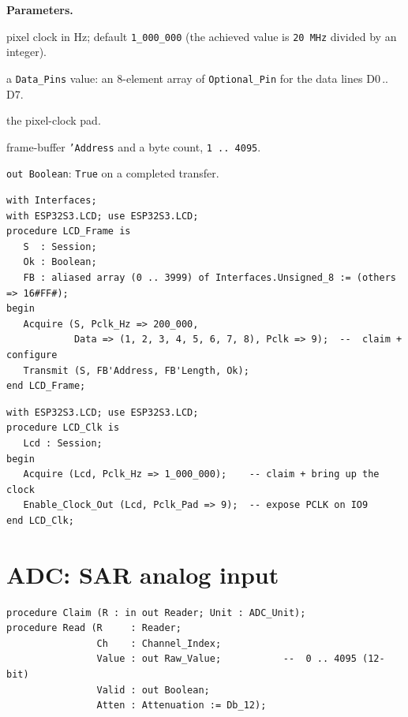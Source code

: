 \textbf{Parameters.}
\begin{description}[style=nextline]
\item[\texttt{Pclk\_Hz}] pixel clock in Hz; default \texttt{1\_000\_000} (the
  achieved value is \texttt{20\,MHz} divided by an integer).
\item[\texttt{Data}] a \texttt{Data\_Pins} value: an 8-element array of
  \texttt{Optional\_Pin} for the data lines D0\,..\,D7.
\item[\texttt{Pclk} / \texttt{Pclk\_Pad}] the pixel-clock pad.
\item[\texttt{Tx}, \texttt{Length}] frame-buffer \texttt{'Address} and a byte
  count, \texttt{1\,..\,4095}.
\item[\texttt{Ok}] \texttt{out Boolean}: \texttt{True} on a completed transfer.
\end{description}

\begin{lstlisting}
with Interfaces;
with ESP32S3.LCD; use ESP32S3.LCD;
procedure LCD_Frame is
   S  : Session;
   Ok : Boolean;
   FB : aliased array (0 .. 3999) of Interfaces.Unsigned_8 := (others => 16#FF#);
begin
   Acquire (S, Pclk_Hz => 200_000,
            Data => (1, 2, 3, 4, 5, 6, 7, 8), Pclk => 9);  --  claim + configure
   Transmit (S, FB'Address, FB'Length, Ok);
end LCD_Frame;
\end{lstlisting}

\begin{lstlisting}
with ESP32S3.LCD; use ESP32S3.LCD;
procedure LCD_Clk is
   Lcd : Session;
begin
   Acquire (Lcd, Pclk_Hz => 1_000_000);    -- claim + bring up the clock
   Enable_Clock_Out (Lcd, Pclk_Pad => 9);  -- expose PCLK on IO9
end LCD_Clk;
\end{lstlisting}

\section{ADC: SAR analog input}

\begin{lstlisting}
procedure Claim (R : in out Reader; Unit : ADC_Unit);
procedure Read (R     : Reader;
                Ch    : Channel_Index;
                Value : out Raw_Value;           --  0 .. 4095 (12-bit)
                Valid : out Boolean;
                Atten : Attenuation := Db_12);
\end{lstlisting}


